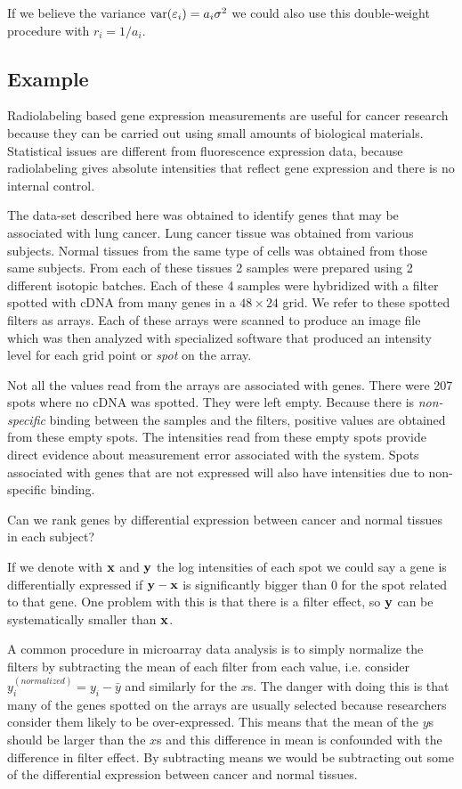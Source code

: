 If we believe the variance $\mbox{var}(\varepsilon_i) = a_i \sigma^2$ we could
also use this double-weight procedure with $r_i = 1/a_i$.

\subsection{Example}

Radiolabeling based gene expression measurements are useful for cancer
research because they can be carried out using small amounts of
biological materials.  
Statistical issues are different from fluorescence
expression data, because radiolabeling gives absolute intensities that
reflect gene expression and 
there is no internal control. 

The data-set described here was obtained to identify genes that
may be associated with lung cancer. Lung cancer tissue was obtained
from various subjects. Normal tissues from the same type of cells was
obtained from those same subjects. From each of   
these tissues 2 samples were prepared using 2 different isotopic
batches. Each of these 4 samples were hybridized with a filter
spotted with cDNA from many genes in a $48 \times 24$ grid. We refer
to these spotted filters as arrays. Each of these arrays were scanned to
produce an image file 
which was then analyzed with 
specialized software that produced an intensity level for each grid
point or {\it spot} on the array. 

Not all the values read  from the arrays are associated with
genes. There were 207 spots where
no cDNA was spotted. They were left empty. Because there is {\it
  non-specific} binding between the samples and the filters, positive
values are 
obtained from these empty spots. The intensities read 
from these empty spots provide direct evidence about measurement error
associated with the system. Spots associated with genes that are not
expressed will also have intensities due to non-specific binding.


Can we rank genes by differential expression between
cancer and normal tissues in each subject? 

If we denote with ${\mathbf x}$ and ${\mathbf y}$ the log intensities of each spot we
could say a gene is differentially expressed if ${\mathbf y} - {\mathbf x}$ is
significantly bigger than 0 for the spot related to that gene.
One problem with this is that there is a filter effect, so ${\mathbf y}$ can
be systematically smaller than ${\mathbf x}$.

A common procedure in microarray data analysis is to simply normalize the
filters by subtracting the mean of each filter from each value,
i.e. consider $y^{(normalized)}_{i} =  y_{i} -
\bar{y}$ and similarly for the $x$s. The danger with doing
this is that many of the genes spotted on the arrays are usually
selected because researchers consider them likely to be
over-expressed. This means 
that the mean of the $y$s should be larger than the $x$s and this
difference in mean is confounded with the difference in filter
effect. By subtracting means we would be subtracting out some of the
differential expression between cancer and normal
tissues. 

